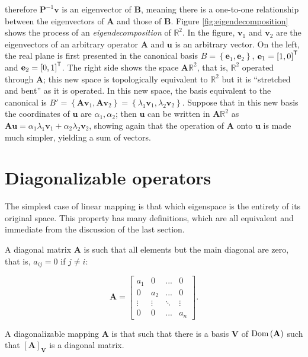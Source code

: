 	\noindent therefore $\mathbf{P}^{-1}\mathbf{v}$ is an eigenvector of $\mathbf{B}$, meaning there is a one-to-one relationship between the eigenvectors of $\mathbf{A}$ and those of $\mathbf{B}$.	Figure \ref{fig:eigendecomposition} shows the process of an \textit{eigendecomposition} of $\mathbb{R}^2$. In the figure, $\mathbf{v}_1$ and $\mathbf{v}_2$ are the eigenvectors of an arbitrary operator $\mathbf{A}$ and $\mathbf{u}$ is an arbitrary vector. On the left, the real plane is first presented in the canonical basis $B = \left\{\mathbf{e}_1,\mathbf{e}_2\right\}$, $\mathbf{e}_1 = \left[1,0\right]^{\mathsf{T}}$ and $\mathbf{e}_2 = \left[0,1\right]^{\mathsf{T}}$. The right side shows the space $\mathbf{A}\mathbb{R}^2$, that is, $\mathbb{R}^2$ operated through $\mathbf{A}$; this new space is topologically equivalent to $\mathbb{R}^2$ but it is ``stretched and bent'' as it is operated. In this new space, the basis equivalent to the canonical is $B' = \left\{\mathbf{Av}_1,\mathbf{Av}_2\right\} = \left\{\lambda_1\mathbf{v}_1,\lambda_2\mathbf{v}_2\right\}$. Suppose that in this new basis the coordinates of $\mathbf{u}$ are $\alpha_1,\alpha_2$; then $\mathbf{u}$ can be written in $\mathbf{A}\mathbb{R}^2$ as $\mathbf{Au} = \alpha_1\lambda_1\mathbf{v}_1 + \alpha_2\lambda_2\mathbf{v}_2$, showing again that the operation of $\mathbf{A}$ onto $\mathbf{u}$ is made much simpler, yielding a sum of vectors.

\section{Diagonalizable operators}\label{sec:diagonalizable_operators} %

	The simplest case of linear mapping is that which eigenspace is the entirety of its original space. This property has many definitions, which are all equivalent and immediate from the discussion of the last section.

\begin{definition} A diagonal matrix $\mathbf{A}$ is such that all elements but the main diagonal are zero, that is, $a_{ij} = 0$ if $j\neq i$:

\begin{equation} \mathbf{A} = \left[\begin{array}{cccc} a_1 & 0 & ... & 0 \\[3mm] 0 & a_2 & ... & 0 \\[3mm] \vdots & \vdots & \ddots & \vdots \\[3mm] 0 & 0 & ... & a_n \end{array}\right]. \end{equation}
\end{definition}
\begin{definition} A diagonalizable mapping $\mathbf{A}$ is that such that there is a basis $\mathbf{V}$ of $\operatorname{Dom}\left(\mathbf{A}\right)$ such that $\left[\mathbf{A}\right]_\mathbf{V}$ is a diagonal matrix. \end{definition}

